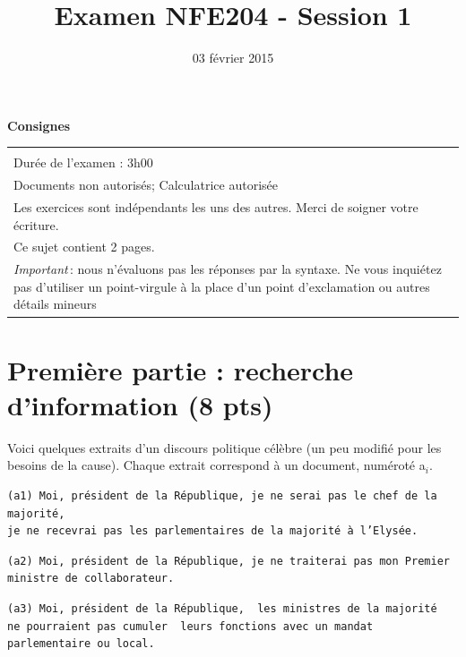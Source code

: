 \documentclass[11pt,a4paper]{article}
\begin{document}
\title{Examen NFE204 - Session 1}
\date{03 février 2015}

\maketitle

\begin{center}
{\bf \Large Consignes}\\
\begin{tabular}{| p{15cm} |}
\hline
\\
Dur\'ee de l'examen : 3h00\\
Documents non autoris\'es;  Calculatrice autoris\'ee\\

Les exercices sont ind\'ependants les uns des autres. Merci de soigner votre \'ecriture.\\
Ce sujet contient 2 pages.\\


\textit{Important}\,: nous n'évaluons pas les réponses par la syntaxe. Ne vous
inquiétez pas d'utiliser un point-virgule à la place d'un point d'exclamation ou
autres détails mineurs
\\
\hline
\end{tabular}
\end{center}

\section*{Première partie : recherche d'information (8 pts)}

Voici quelques extraits d'un discours politique célèbre (un peu modifié pour les besoins de la cause). Chaque
extrait correspond à un document, numéroté a$_i$.

\begin{small}
\begin{verbatim}
(a1) Moi, président de la République, je ne serai pas le chef de la majorité, 
je ne recevrai pas les parlementaires de la majorité à l’Elysée.
\end{verbatim}
\end{small}

\begin{small}
\begin{verbatim}
(a2) Moi, président de la République, je ne traiterai pas mon Premier ministre de collaborateur.
\end{verbatim}
\end{small}

\begin{small}
\begin{verbatim}
(a3) Moi, président de la République,  les ministres de la majorité
ne pourraient pas cumuler  leurs fonctions avec un mandat parlementaire ou local.
\end{verbatim}
\end{small}
\end{document}
